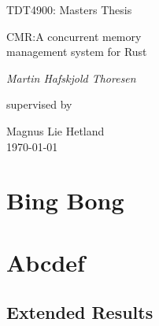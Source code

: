 \documentclass[b5paper, twoside, openright]{report}
\theoremstyle{plain}
\theoremstyle{definition}
\begin{document}
\renewcommand{\thepage}{\roman{page}}%

\begin{titlepage}
  \centering
  \vspace{1.5cm}
  {\Large TDT4900: Masters Thesis \par}
  \vspace{1cm}
  {\huge CMR:\@ A concurrent memory\\ management system for Rust\par}
  \vspace{2cm}
  {\Large\itshape{}Martin Hafskjold Thoresen\par}
  \vfill
  supervised by\par
  {\large Magnus Lie Hetland}\\
  \vfill
  {\large \today\\}
\end{titlepage}








\tableofcontents%
\listoffigures%


\clearpage\null%
\clearpage\setcounter{page}{1}%
\renewcommand{\thepage}{\arabic{page}}%
\part{Bing Bong}

\pagestyle{fancy}










\part{Abcdef}











\begin{appendices}
\appendix
  \chapter{Extended Results\label{ap:results}}
\end{appendices}

\printglossary[type=\acronymtype,title=Abbreviations]
\printglossary{}



\end{document}
